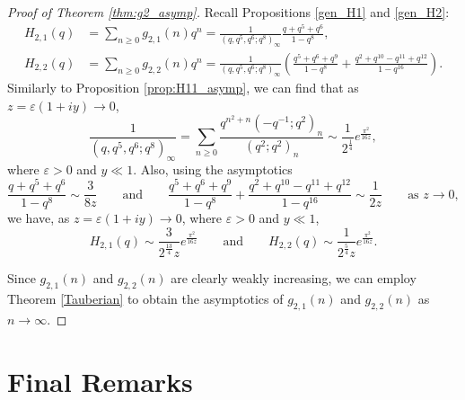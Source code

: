 \documentclass[11pt,reqno]{amsart}
\theoremstyle{remark}
\numberwithin{equation}{section}
\begin{document}
\begin{proof}[Proof of Theorem \ref{thm:g2_asymp}]
Recall Propositions \ref{gen_H1} and \ref{gen_H2}:
\begin{align*}
	H_{2,1}(q)&=\sum_{n\ge 0} g_{2,1}(n)q^n = \frac{1}{(q, q^5, q^6;q^8)_{\infty}} \frac{q+q^5+q^6}{1-q^{8}},\\
	H_{2,2}(q)&=\sum_{n\ge 0} g_{2,2}(n) q^{n} = \frac{1}{(q,q^5,q^6;q^8)_\infty}\left( \frac{q^5+q^6+q^9}{1-q^8} + \frac{q^2+q^{10}-q^{11}+q^{12}}{1-q^{16}} \right).
\end{align*}
Similarly to Proposition \ref{prop:H11_asymp}, we can find that as $z=\varepsilon(1+iy) \to 0$,   
\[
	\frac{1}{(q, q^5, q^6;q^8)_{\infty}} = \sum_{n \geq 0} \frac{ q^{n^2+n} (-q^{-1};q^2)_n}{(q^2;q^2)_n} \sim \frac{1}{2^{\frac14}} e^{\frac{\pi^2}{16 z}},
\]
where $\varepsilon>0$ and $y \ll 1$. Also, using the asymptotics
\[
	\frac{q+q^5+q^6}{1-q^8} \sim \frac{3}{8z}  \qquad\text{and}\qquad 
	\frac{q^5+q^6+q^9}{1-q^8} + \frac{q^2+q^{10}-q^{11}+q^{12}}{1-q^{16}} \sim \frac{1}{2z} \qquad \text{as } z \to 0,
\]
we have, as $z=\varepsilon(1+iy) \to 0$, where $\varepsilon>0$ and $y \ll 1$,  
\[
	H_{2,1}(q) \sim \frac{3}{2^{\frac{13}{4}}z} e^{\frac{\pi^2}{16z}} \qquad\text{and}\qquad 
	H_{2,2}(q) \sim \frac{1}{2^{\frac{5}{4}}z} e^{\frac{\pi^2}{16z}}. 
\]

Since $g_{2,1}(n)$ and $g_{2,2}(n)$ are clearly weakly increasing, we can employ Theorem  \ref{Tauberian} to obtain the asymptotics of $g_{2,1}(n)$ and $g_{2,2}(n)$ as $n \to \infty$. 
\end{proof} 

\section{Final Remarks}\label{sec7}
\end{document}
